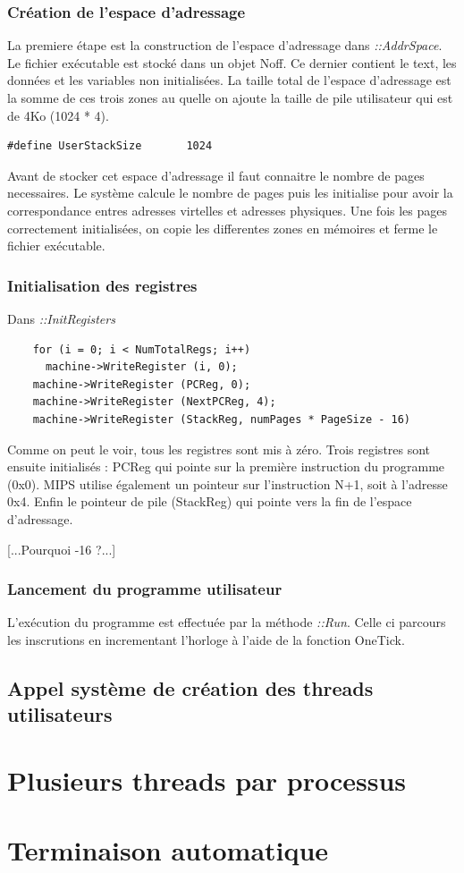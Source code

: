 \documentclass[a4paper,10pt]{article}
\begin{document}
\subsubsection{Création de l'espace d'adressage}

La premiere étape est la construction de l'espace d'adressage dans
\textit{::AddrSpace}. Le fichier exécutable est stocké dans un objet Noff. Ce
dernier contient le text, les données et les variables non initialisées. La
taille total de l'espace d'adressage est la somme de ces trois zones au quelle
on ajoute la taille de pile utilisateur qui est de 4Ko (1024 * 4).

\begin{lstlisting}
#define UserStackSize		1024
\end{lstlisting}

Avant de stocker cet espace d'adressage il faut connaitre le nombre de pages
necessaires. Le système calcule le nombre de pages puis les initialise pour
avoir la correspondance entres adresses virtelles et adresses physiques. Une
fois les pages correctement initialisées, on copie les differentes zones en
mémoires et ferme le fichier exécutable.

\subsubsection{Initialisation des registres}

Dans \textit{::InitRegisters}
\begin{lstlisting}
    for (i = 0; i < NumTotalRegs; i++)
      machine->WriteRegister (i, 0);
    machine->WriteRegister (PCReg, 0);
    machine->WriteRegister (NextPCReg, 4);
    machine->WriteRegister (StackReg, numPages * PageSize - 16)
\end{lstlisting}

Comme on peut le voir, tous les registres sont mis à zéro. Trois
registres sont ensuite initialisés : PCReg qui pointe sur la première
instruction du programme (0x0). MIPS utilise également un pointeur sur
l'instruction N+1, soit à l'adresse 0x4. Enfin le pointeur de pile (StackReg)
qui pointe vers la fin de l'espace d'adressage.

[...Pourquoi -16 ?...]

\subsubsection{Lancement du programme utilisateur}

L'exécution du programme est effectuée par la méthode \textit{::Run}. Celle ci
parcours les inscrutions en incrementant l'horloge à l'aide de la fonction
OneTick.

\subsection{Appel système de création des threads utilisateurs}





\section{Plusieurs threads par processus}


\section{Terminaison automatique}
\end{document}
